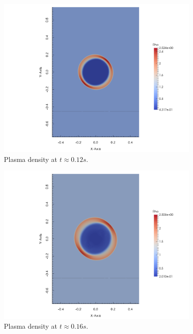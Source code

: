 \begin{figure}[H]
    \vspace{-5mm}
    \begin{center}
        \includegraphics[width=0.9\textwidth]{img/density-10.png}
    \end{center} 
    \vspace{-10mm}
    \caption{Plasma density at $t \approx 0.12s$.}
\end{figure} 
\begin{figure}[H]
    \vspace{-5mm}
    \begin{center}
        \includegraphics[width=0.9\textwidth]{img/density-14.png}
    \end{center} 
    \vspace{-10mm}
    \caption{Plasma density at $t \approx 0.16s$.}
\end{figure} 
